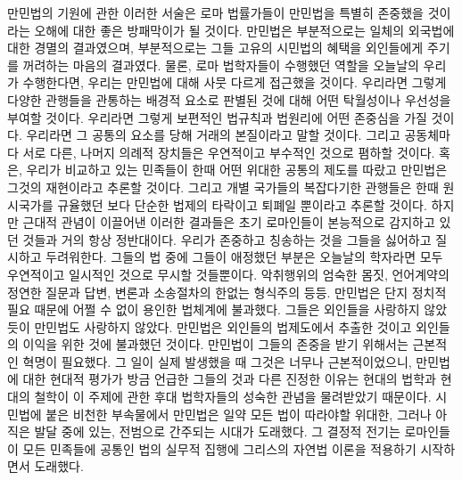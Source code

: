만민법의 기원에 관한 이러한 서술은
로마 법률가들이 만민법을 특별히 존중했을 것이라는 오해에 대한
좋은 방패막이가 될 것이다.
만민법은 부분적으로는 일체의 외국법에 대한 경멸의 결과였으며,
부분적으로는 그들 고유의 시민법의 혜택을 외인들에게 주기를 꺼려하는
마음의 결과였다.
물론, 로마 법학자들이 수행했던 역할을 오늘날의 우리가 수행한다면,
우리는 만민법에 대해 사뭇 다르게 접근했을 것이다.
우리라면 그렇게 다양한 관행들을 관통하는 배경적 요소로 판별된 것에 대해
어떤 탁월성이나 우선성을 부여할 것이다.
우리라면 그렇게 보편적인 법규칙과 법원리에 어떤 존중심을 가질 것이다.
우리라면 그 공통의 요소를 당해 거래의 본질이라고 말할 것이다.
그리고 공동체마다 서로 다른, 나머지 의례적 장치들은
우연적이고 부수적인 것으로 폄하할 것이다.
혹은, 우리가 비교하고 있는 민족들이 한때 어떤 위대한 공통의 제도를
따랐고 만민법은 그것의 재현이라고 추론할 것이다.
그리고 개별 국가들의 복잡다기한 관행들은 한때 원시국가를 규율했던
보다 단순한 법제의 타락이고 퇴폐일 뿐이라고 추론할 것이다.
하지만 근대적 관념이 이끌어낸 이러한 결과들은
초기 로마인들이 본능적으로 감지하고 있던 것들과
거의 항상 정반대이다.
우리가 존중하고 칭송하는 것을 그들을 싫어하고 질시하고 두려워한다.
그들의 법 중에 그들이 애정했던 부분은
오늘날의 학자라면 모두 우연적이고 일시적인 것으로 무시할 것들뿐이다.
악취행위의 엄숙한 몸짓, 언어계약의 정연한 질문과 답변,
변론과 소송절차의 한없는 형식주의 등등.
만민법은 단지 정치적 필요 때문에 어쩔 수 없이 용인한 법체계에 불과했다.
그들은 외인들을 사랑하지 않았듯이 만민법도 사랑하지 않았다.
만민법은 외인들의 법제도에서 추출한 것이고 외인들의 이익을 위한 것에 불과했던
것이다.
만민법이 그들의 존중을 받기 위해서는 근본적인 혁명이 필요했다.
그 일이 실제 발생했을 때 그것은 너무나 근본적이었으니,
만민법에 대한 현대적 평가가 방금 언급한 그들의 것과 다른 진정한 이유는
현대의 법학과 현대의 철학이
이 주제에 관한 후대 법학자들의 성숙한 관념을
물려받았기 때문이다.
시민법에 붙은 비천한 부속물에서
만민법은 일약 모든 법이 따라야할 위대한, 그러나 아직은 발달 중에 있는,
전범으로 간주되는 시대가 도래했다.
그 결정적 전기는
로마인들이
모든 민족들에 공통인 법의 실무적 집행에
그리스의 자연법 이론을
적용하기 시작하면서 도래했다.

